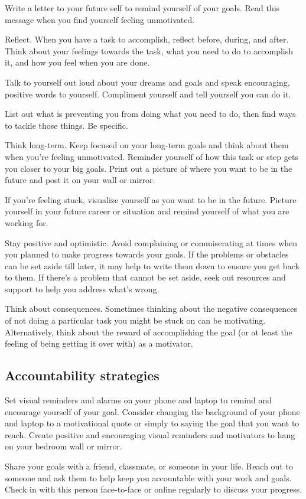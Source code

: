 \documentclass[../main.tex]{subfiles}
\begin{document}
Write a letter to your future self to remind yourself of your goals. Read this
message when you find yourself feeling unmotivated.

Reflect. When you have a task to accomplish, reflect before, during, and after.
Think about your feelings towards the task, what you need to do to accomplish
it, and how you feel when you are done.

Talk to yourself out loud about your dreams and goals and speak encouraging,
positive words to yourself. Compliment yourself and tell yourself you can do it.

List out what is preventing you from doing what you need to do, then find ways
to tackle those things. Be specific.

Think long-term. Keep focused on your long-term goals and think about them when
you’re feeling unmotivated. Reminder yourself of how this task or step gets you
closer to your big goals. Print out a picture of where you want to be in the
future and post it on your wall or mirror.

If you’re feeling stuck, visualize yourself as you want to be in the future.
Picture yourself in your future career or situation and remind yourself of what
you are working for.

Stay positive and optimistic. Avoid complaining or commiserating at times when
you planned to make progress towards your goals. If the problems or obstacles
can be set aside till later, it may help to write them down to ensure you get
back to them. If there’s a problem that cannot be set aside, seek out resources
and support to help you address what’s wrong.

Think about consequences. Sometimes thinking about the negative consequences of
not doing a particular task you might be stuck on can be motivating.
Alternatively, think about the reward of accomplishing the goal (or at least the
feeling of being getting it over with) as a motivator.
%
\subsection{Accountability strategies}
Set visual reminders and alarms on your phone and laptop to remind and encourage
yourself of your goal. Consider changing the background of your phone and laptop
to a motivational quote or simply to saying the goal that you want to reach.
Create positive and encouraging visual reminders and motivators to hang on your
bedroom wall or mirror.

Share your goals with a friend, classmate, or someone in your life. Reach out to
someone and ask them to help keep you accountable with your work and goals.
Check in with this person face-to-face or online regularly to discuss your
progress.
%
\end{document}
